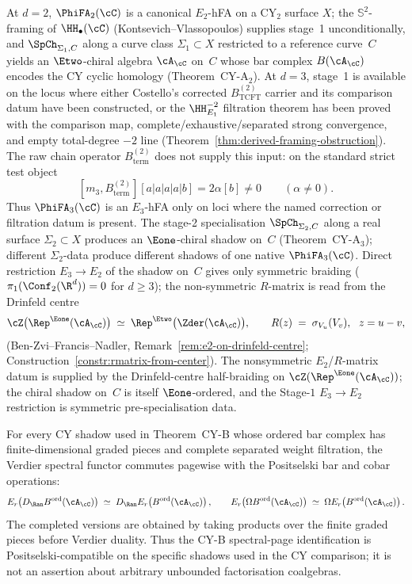 At $d = 2$, $\PhiFA_2(\cC)$ is a canonical $E_2$-hFA on a CY$_2$
surface $X$; the $\mathbb{S}^2$-framing of $\HH_\bullet(\cC)$
(Kontsevich--Vlassopoulos) supplies stage~1 unconditionally, and
$\SpCh_{\Sigma_1, C}$ along a curve class $\Sigma_1\subset X$
restricted to a reference curve~$C$ yields an $\Etwo$-chiral
algebra $\cA_\cC$ on~$C$ whose bar complex $B(\cA_\cC)$ encodes
the CY cyclic homology (Theorem~CY-A$_2$). At $d = 3$, stage~1
is available on the locus where either Costello's corrected
$B^{(2)}_{\mathrm{TCFT}}$ carrier and its comparison datum have been
constructed, or the $\HH^{-2}_{E_1}$ filtration theorem has been proved
with the comparison map, complete/exhaustive/separated strong
convergence, and empty total-degree $-2$ line
(Theorem~\ref{thm:derived-framing-obstruction}). The raw chain
operator $B^{(2)}_{\mathrm{term}}$ does not supply this input:
on the standard strict test object
\[
 [m_3,B^{(2)}_{\mathrm{term}}][a|a|a|a|b]
 = 2\alpha[b]\neq0
 \qquad(\alpha\neq0).
\]
Thus $\PhiFA_3(\cC)$ is an $E_3$-hFA only on loci where the named
correction or filtration datum is present. The stage-2
specialisation $\SpCh_{\Sigma_2, C}$ along a real surface
$\Sigma_2\subset X$ produces an $\Eone$-chiral shadow on~$C$
(Theorem~CY-A$_3$); different $\Sigma_2$-data produce different
shadows of one native $\PhiFA_3(\cC)$. Direct restriction
$E_3 \to E_2$ of the shadow on~$C$ gives only symmetric braiding
($\pi_1(\Conf_2(\R^d)) = 0$ for $d \geq 3$); the non-symmetric
$R$-matrix is read from the Drinfeld centre
\[
 \cZ\bigl(\Rep^{\Eone}(\cA_\cC)\bigr)
 \;\simeq\; \Rep^{\Etwo}\bigl(\Zder(\cA_\cC)\bigr),
 \qquad
 R(z) \;=\; \sigma_{V_u}(V_v),\ \ z = u - v,
\]
(Ben-Zvi--Francis--Nadler, Remark~\ref{rem:e2-on-drinfeld-centre};
Construction~\ref{constr:rmatrix-from-center}). The nonsymmetric
$E_2$/$R$-matrix datum is supplied by the Drinfeld-centre half-braiding
on $\cZ(\Rep^{\Eone}(\cA_\cC))$; the chiral shadow on~$C$ is itself
$\Eone$-ordered, and the Stage-$1$ $E_3\to E_2$ restriction is symmetric
pre-specialisation data.

\begin{lemma}
\label{lem:positselski-verdier-spectral-functor}
For every CY shadow used in Theorem~CY-B whose ordered bar complex has
finite-dimensional graded pieces and complete separated weight
filtration, the Verdier spectral functor commutes pagewise with the
Positselski bar and cobar operations:
\[
 E_r\!\left(D_{\Ran}B^{\mathrm{ord}}(\cA_\cC)\right)
 \;\simeq\;
 D_{\Ran}E_r\!\left(B^{\mathrm{ord}}(\cA_\cC)\right),
 \qquad
 E_r\!\left(\Omega B^{\mathrm{ord}}(\cA_\cC)\right)
 \;\simeq\;
 \Omega E_r\!\left(B^{\mathrm{ord}}(\cA_\cC)\right).
\]
The completed versions are obtained by taking products over the finite
graded pieces before Verdier duality. Thus the CY-B spectral-page
identification is Positselski-compatible on the specific shadows used in
the CY comparison; it is not an assertion about arbitrary unbounded
factorisation coalgebras.
\end{lemma}


